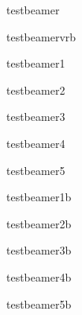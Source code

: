 \documentclass{beamer}
\begin{document}
\begin{frame}
  testbeamer \\ 
\end{frame}

\begin{frame}
  testbeamervrb \\ 
\end{frame}

\begin{frame}
  testbeamer1 \\ 
\end{frame}

\begin{frame}
  testbeamer2 \\ 
\end{frame}

\begin{frame}
  testbeamer3 \\ 
\end{frame}

\begin{frame}
  testbeamer4 \\ 
\end{frame}

\begin{frame}
  testbeamer5 \\ 
\end{frame}

\begin{frame}
  testbeamer1b \\ 
\end{frame}

\begin{frame}
  testbeamer2b \\ 
\end{frame}

\begin{frame}
  testbeamer3b \\ 
\end{frame}

\begin{frame}
  testbeamer4b \\ 
\end{frame}

\begin{frame}
  testbeamer5b \\ 
\end{frame}
\end{document}

